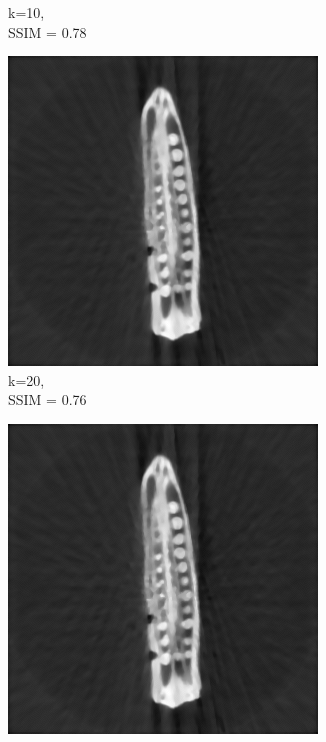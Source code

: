\documentclass[journal]{IEEEtran}
\begin{document}
\begin{figure}[h]
\begin{subfigure}[b]{0.24\linewidth}
        \caption{k=10,\\ SSIM = 0.78}
     \end{subfigure} 
  \begin{subfigure}[b]{0.24\linewidth}
        \includegraphics[width=\textwidth]{../images/okra/post_TCI/2D/48_views/tuning_k/weighted_prior_kk_20_lambda_prior_0.700000.png}
        \caption{k=20,\\ SSIM = 0.76}
     \end{subfigure}
  \begin{subfigure}[b]{0.24\linewidth}
        \includegraphics[width=\textwidth]{../images/okra/post_TCI/2D/48_views/tuning_k/weighted_prior_kk_30_lambda_prior_0.700000.png}

\end{subfigure}
\end{figure}
\end{document}
